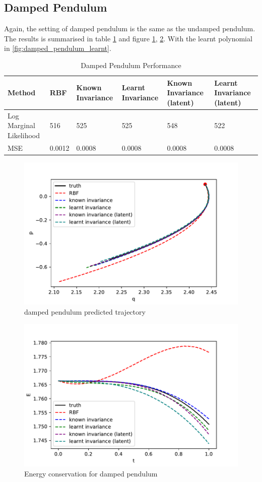 \documentclass{statsmsc}
\begin{document}
\subsection{Damped Pendulum}
Again, the setting of damped pendulum is the same as the undamped pendulum.
The results is summarised in table \ref{tab:damped_pendulum_performance} and figure \ref{fig:damped_pendulum_prediction}, \ref{fig:damped_pendulum_energy}.
With the learnt polynomial in \ref{fig:damped_pendulum_learnt}.

\begin{table}[H]
  \centering
  \begin{tabular}{l l l l l l}
    \hline
Method           & RBF & Known Invariance&  Learnt Invariance & Known Invariance (latent) & Learnt Invariance (latent)\\
  \hline
Log Marginal Likelihood & 516 & 525 & 525 & 548 & 522 \\
MSE & 0.0012 & 0.0008 & 0.0008 & 0.0008 & 0.0008 \\

    \hline
  \end{tabular}
  \caption{Damped Pendulum Performance}
  \label{tab:damped_pendulum_performance}
\end{table}

\begin{figure}[H]
        \centering
        \includegraphics[width=0.8\linewidth]{../codes/figures/damped_pendulum_predicted.pdf}
        \caption{damped pendulum predicted trajectory}
        \label{fig:damped_pendulum_prediction}
\end{figure}

\begin{figure}[H] 
  \includegraphics[width=0.8\linewidth]{../codes/figures/damped_pendulum_energy.pdf}
  \centering
  \caption{Energy conservation for damped pendulum}
  \label{fig:damped_pendulum_energy}
\end{figure}
\end{document}
